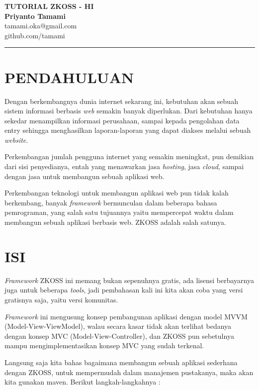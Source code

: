 \documentclass[pdftex, 12pt, oneside]{article}
\newcommand{\HRule}{\rule{\linewidth}{0.5mm}}
\begin{document}
\textbf{\large TUTORIAL ZKOSS - HI }
\\[1cm]
\textbf{Priyanto Tamami}\\
tamami.oka@gmail.com\\
github.com/tamami

\HRule

\section{PENDAHULUAN}

Dengan berkembangnya dunia internet sekarang ini, kebutuhan akan sebuah sistem informasi berbasis \textit{web} semakin banyak diperlukan. Dari kebutuhan hanya sekedar menampilkan informasi perusahaan, sampai kepada pengolahan data entry sehingga menghasilkan laporan-laporan yang dapat diakses melalui sebuah \textit{website}.

Perkembangan jumlah pengguna internet yang semakin meningkat, pun demikian dari sisi penyedianya, entah yang menawarkan jasa \textit{hosting}, jasa \textit{cloud}, sampai dengan jasa untuk membangun sebuah aplikasi web.

Perkembangan teknologi untuk membangun aplikasi web pun tidak kalah berkembang, banyak \textit{framework} bermunculan dalam beberapa bahasa pemrograman, yang salah satu tujuannya yaitu mempercepat waktu dalam membangun sebuah aplikasi berbasis web. ZKOSS adalah salah satunya.

\section{ISI}

\textit{Framework} ZKOSS ini memang bukan sepenuhnya gratis, ada lisensi berbayarnya juga untuk beberapa \textit{tools}, jadi pembahasan kali ini kita akan coba yang versi gratisnya saja, yaitu versi komunitas.

\textit{Framework} ini mengusung konsep pembangunan aplikasi dengan model MVVM (Model-View-ViewModel), walau secara kasar tidak akan terlihat bedanya dengan konsep MVC (Model-View-Controller), dan ZKOSS pun sebetulnya mampu mengimplementasikan konsep MVC yang sudah terkenal.

Langsung saja kita bahas bagaimana membangun sebuah aplikasi sederhana dengan ZKOSS, untuk mempermudah dalam manajemen pustakanya, maka akan kita gunakan maven. Berikut langkah-langkahnya :
\end{document}
